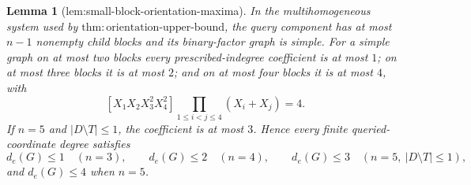 \documentclass{article}
\newtheorem{lemma}{Lemma}
\begin{document}
\begin{lemma}[lem:small-block-orientation-maxima]\label{lem:small-block-orientation-maxima}
In the multihomogeneous system used by \(\mathrm{thm:orientation\mbox{-}upper\mbox{-}bound}\), the query component has at most \(n-1\) nonempty child blocks and its binary-factor graph is simple. For a simple graph on at most two blocks every prescribed-indegree coefficient is at most \(1\); on at most three blocks it is at most \(2\); and on at most four blocks it is at most \(4\), with
\[
 [X_1X_2X_3^2X_4^2]\prod_{1\leq i<j\leq4}(X_i+X_j)=4.
\]
If \(n=5\) and \(|D\setminus T|\leq1\), the coefficient is at most \(3\). Hence every finite queried-coordinate degree satisfies
\[
 d_e(G)\leq1\quad(n=3),\qquad
 d_e(G)\leq2\quad(n=4),\qquad
 d_e(G)\leq3\quad(n=5,\ |D\setminus T|\leq1),
\]
and \(d_e(G)\leq4\) when \(n=5\).
\end{lemma}
\end{document}
